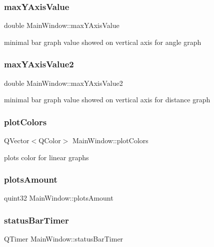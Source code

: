 \subsubsection{max\+Y\+Axis\+Value}
{\footnotesize\ttfamily double Main\+Window\+::max\+Y\+Axis\+Value\hspace{0.3cm}{\ttfamily [private]}}

minimal bar graph value showed on vertical axis for angle graph \mbox{\label{class_main_window_a5cbbcacb99514a12d6743ebb45836f12}} 
\subsubsection{max\+Y\+Axis\+Value2}
{\footnotesize\ttfamily double Main\+Window\+::max\+Y\+Axis\+Value2\hspace{0.3cm}{\ttfamily [private]}}

minimal bar graph value showed on vertical axis for distance graph \mbox{\label{class_main_window_af05a0194c683ce9a5abb789e636494da}} 
\subsubsection{plot\+Colors}
{\footnotesize\ttfamily Q\+Vector$<$Q\+Color$>$ Main\+Window\+::plot\+Colors\hspace{0.3cm}{\ttfamily [private]}}

plot\textquotesingle{}s color for linear graphs \mbox{\label{class_main_window_a390ce6d302bff7952eee7d92a6cf3da3}} 
\subsubsection{plots\+Amount}
{\footnotesize\ttfamily quint32 Main\+Window\+::plots\+Amount\hspace{0.3cm}{\ttfamily [private]}}

\mbox{\label{class_main_window_af66c315b651ade2e54045edb68c51c86}} 
\subsubsection{status\+Bar\+Timer}
{\footnotesize\ttfamily Q\+Timer Main\+Window\+::status\+Bar\+Timer\hspace{0.3cm}{\ttfamily [private]}}

